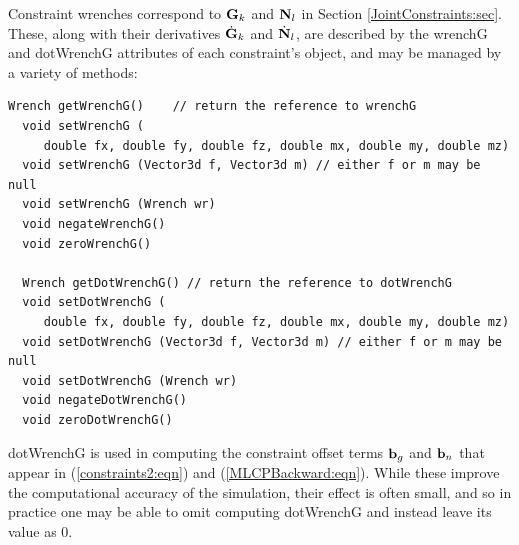 Constraint wrenches correspond to ${\bf G}_k$ and ${\bf N}_l$ in Section
\ref{JointConstraints:sec}. These, along with their derivatives
$\dot{{\bf G}}_k$ and $\dot{{\bf N}}_l$, are described by the {\sf wrenchG} and {\sf
dotWrenchG} attributes of each constraint's
 object, and may
be managed by a variety of methods:
\begin{lstlisting}[]
  Wrench getWrenchG()    // return the reference to wrenchG
  void setWrenchG (
     double fx, double fy, double fz, double mx, double my, double mz)
  void setWrenchG (Vector3d f, Vector3d m) // either f or m may be null
  void setWrenchG (Wrench wr)
  void negateWrenchG()
  void zeroWrenchG()

  Wrench getDotWrenchG() // return the reference to dotWrenchG
  void setDotWrenchG (
     double fx, double fy, double fz, double mx, double my, double mz)
  void setDotWrenchG (Vector3d f, Vector3d m) // either f or m may be null
  void setDotWrenchG (Wrench wr)
  void negateDotWrenchG()
  void zeroDotWrenchG()
\end{lstlisting}
%

\begin{sideblock}
{\sf dotWrenchG} is used in computing the constraint offset terms ${\bf b}_g$ and
${\bf b}_n$ that appear in (\ref{constraints2:eqn}) and
(\ref{MLCPBackward:eqn}). While these improve the computational accuracy of the
simulation, their effect is often small, and so in practice one may be able to
omit computing {\sf dotWrenchG} and instead leave its value as 0.
\end{sideblock}

